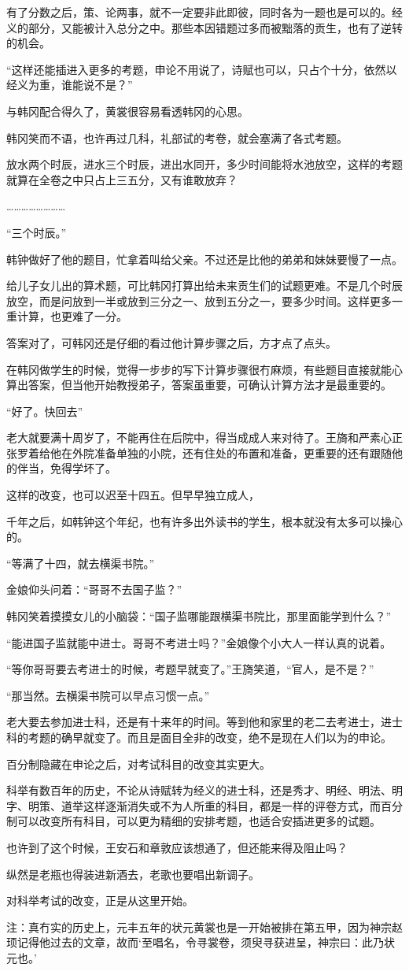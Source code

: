 有了分数之后，策、论两事，就不一定要非此即彼，同时各为一题也是可以的。经义的部分，又能被计入总分之中。那些本因错题过多而被黜落的贡生，也有了逆转的机会。

“这样还能插进入更多的考题，申论不用说了，诗赋也可以，只占个十分，依然以经义为重，谁能说不是？”

与韩冈配合得久了，黄裳很容易看透韩冈的心思。

韩冈笑而不语，也许再过几科，礼部试的考卷，就会塞满了各式考题。

放水两个时辰，进水三个时辰，进出水同开，多少时间能将水池放空，这样的考题就算在全卷之中只占上三五分，又有谁敢放弃？

……………………

“三个时辰。”

韩钟做好了他的题目，忙拿着叫给父亲。不过还是比他的弟弟和妹妹要慢了一点。

给儿子女儿出的算术题，可比韩冈打算出给未来贡生们的试题更难。不是几个时辰放空，而是问放到一半或放到三分之一、放到五分之一，要多少时间。这样更多一重计算，也更难了一分。

答案对了，可韩冈还是仔细的看过他计算步骤之后，方才点了点头。

在韩冈做学生的时候，觉得一步步的写下计算步骤很冇麻烦，有些题目直接就能心算出答案，但当他开始教授弟子，答案虽重要，可确认计算方法才是最重要的。

“好了。快回去”

老大就要满十周岁了，不能再住在后院中，得当成成人来对待了。王旖和严素心正张罗着给他在外院准备单独的小院，还有住处的布置和准备，更重要的还有跟随他的伴当，免得学坏了。

这样的改变，也可以迟至十四五。但早早独立成人，

千年之后，如韩钟这个年纪，也有许多出外读书的学生，根本就没有太多可以操心的。

“等满了十四，就去横渠书院。”

金娘仰头问着：“哥哥不去国子监？”

韩冈笑着摸摸女儿的小脑袋：“国子监哪能跟横渠书院比，那里面能学到什么？”

“能进国子监就能中进士。哥哥不考进士吗？”金娘像个小大人一样认真的说着。

“等你哥哥要去考进士的时候，考题早就变了。”王旖笑道，“官人，是不是？”

“那当然。去横渠书院可以早点习惯一点。”

老大要去参加进士科，还是有十来年的时间。等到他和家里的老二去考进士，进士科的考题的确早就变了。而且是面目全非的改变，绝不是现在人们以为的申论。

百分制隐藏在申论之后，对考试科目的改变其实更大。

科举有数百年的历史，不论从诗赋转为经义的进士科，还是秀才、明经、明法、明字、明策、道举这样逐渐消失或不为人所重的科目，都是一样的评卷方式，而百分制可以改变所有科目，可以更为精细的安排考题，也适合安插进更多的试题。

也许到了这个时候，王安石和章敦应该想通了，但还能来得及阻止吗？

纵然是老瓶也得装进新酒去，老歌也要唱出新调子。

对科举考试的改变，正是从这里开始。

注：真冇实的历史上，元丰五年的状元黄裳也是一开始被排在第五甲，因为神宗赵顼记得他过去的文章，故而‘至唱名，令寻裳卷，须臾寻获进呈，神宗曰：此乃状元也。’
